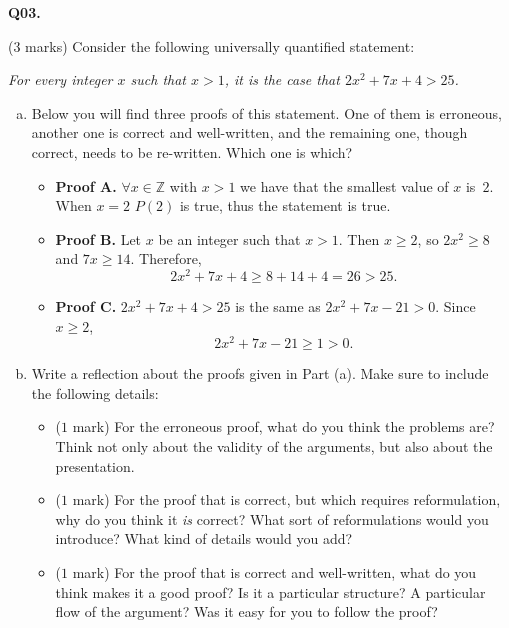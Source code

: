 \documentclass[11pt]{article}
\begin{document}
\textbf{Q03.}

($3$ marks) Consider the following universally quantified statement:
%
\begin{center}
\emph{For every integer $x$ such that $x > 1$, it is the case that $2x^2 + 7x + 4 > 25$.}
\end{center}


\begin{enumerate}[(a)]
\item Below you will find three proofs of this statement. One of them is erroneous, another one is correct and well-written, and the remaining one, though correct, needs to be re-written. Which one is which?
%
\begin{itemize}
\item \textbf{Proof A.} $\forall x \in \mathbb Z$ with $x > 1$ we have that the smallest value of $x$ \mbox{is $2$}. When $x = 2$ $P(2)$ is true, thus the statement is true.

\item \textbf{Proof B.} Let $x$ be an integer such that $x > 1$. Then $x \geq 2$, so $2x^2 \geq 8$ and $7x \geq 14$. Therefore,
%
$$
2x^2 + 7x + 4 \geq 8 + 14 + 4 = 26 > 25.
$$

\item \textbf{Proof C.} $2x^2 + 7x + 4 > 25$ is the same as $2x^2 + 7x - 21 > 0$. Since $x \geq 2$,
%
$$
2x^2 + 7x - 21 \geq 1 > 0.
$$
\end{itemize}

\item Write a reflection about the proofs given in Part (a). Make sure to include the following details:
%
\begin{itemize}
\item ($1$ mark) For the erroneous proof, what do you think the problems are? Think not only about the validity of the arguments, but also about the presentation.

\item ($1$ mark) For the proof that is correct, but which requires reformulation, why do you think it \emph{is} correct? What sort of reformulations would you introduce? What kind of details would you add?

\item ($1$ mark) For the proof that is correct and well-written, what do you think makes it a good proof? Is it a particular structure? A particular flow of the argument? Was it easy for you to follow the proof?
\end{itemize}
\end{enumerate}
\end{document}
